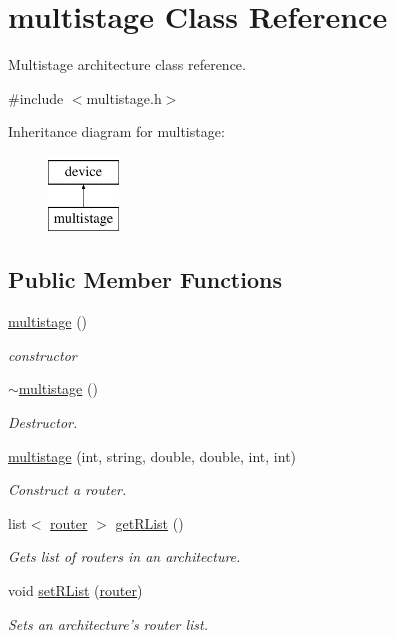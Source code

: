 \hypertarget{classmultistage}{\section{multistage \-Class \-Reference}
\label{classmultistage}
}


\-Multistage architecture class reference.  




{\ttfamily \#include $<$multistage.\-h$>$}

\-Inheritance diagram for multistage\-:\begin{figure}[H]
\begin{center}
\leavevmode
\includegraphics[height=2.000000cm]{classmultistage}
\end{center}
\end{figure}
\subsection*{\-Public \-Member \-Functions}
\begin{DoxyCompactItemize}
\item 
\hyperlink{classmultistage_abbfa555a8fbdfe7f70efa06fddbaa335}{multistage} ()
\begin{DoxyCompactList}\small\item\em constructor \end{DoxyCompactList}\item 
\hyperlink{classmultistage_a3ce104e1cd528efc9f4f2b8b8c2f54a7}{$\sim$multistage} ()
\begin{DoxyCompactList}\small\item\em \-Destructor. \end{DoxyCompactList}\item 
\hyperlink{classmultistage_adcbb45a38e0184f037cdc03504dced05}{multistage} (int, string, double, double, int, int)
\begin{DoxyCompactList}\small\item\em \-Construct a router. \end{DoxyCompactList}\item 
list$<$ \hyperlink{classrouter}{router} $>$ \hyperlink{classmultistage_ad42d7006ba661c60eb4958f8534ad89a}{get\-R\-List} ()
\begin{DoxyCompactList}\small\item\em \-Gets list of routers in an architecture. \end{DoxyCompactList}\item 
void \hyperlink{classmultistage_a6f79ee151acaff9a49e06a3300371a2c}{set\-R\-List} (\hyperlink{classrouter}{router})
\begin{DoxyCompactList}\small\item\em \-Sets an architecture's router list. \end{DoxyCompactList}\end{DoxyCompactItemize}


